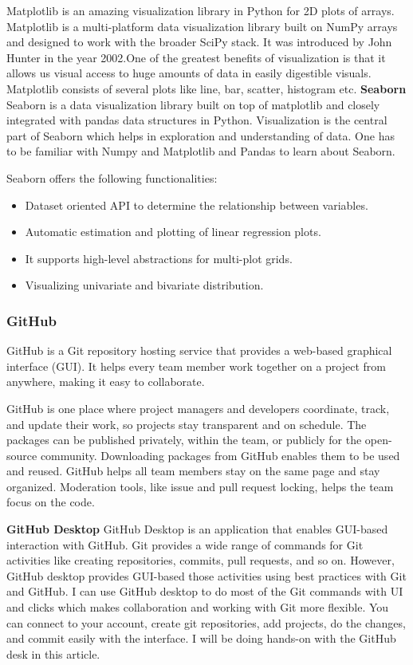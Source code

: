 \documentclass[12pt]{article}
\begin{document}
Matplotlib is an amazing visualization library in Python for 2D plots of arrays. Matplotlib is a multi-platform data visualization library built on NumPy arrays and designed to work with the broader SciPy stack. It was introduced by John Hunter in the year 2002.One of the greatest benefits of visualization is that it allows us visual access to huge amounts of data in easily digestible visuals. Matplotlib consists of several plots like line, bar, scatter, histogram etc.
\textbf{Seaborn}
\\
Seaborn is a data visualization library built on top of matplotlib and closely integrated with pandas data structures in Python. Visualization is the central part of Seaborn which helps in exploration and understanding of data. One has to be familiar with Numpy and Matplotlib and Pandas to learn about Seaborn.

Seaborn offers the following functionalities:
\begin{itemize}
\item Dataset oriented API to determine the relationship between variables.
\item Automatic estimation and plotting of linear regression plots.
\item It supports high-level abstractions for multi-plot grids.
\item Visualizing univariate and bivariate distribution.
\end{itemize}

\newpage
\subsubsection{GitHub}
GitHub is a Git repository hosting service that provides a web-based graphical interface (GUI). It helps every team member work together on a project from anywhere, making it easy to collaborate. 

GitHub is one place where project managers and developers coordinate, track, and update their work, so projects stay transparent and on schedule. The packages can be published privately, within the team, or publicly for the open-source community. Downloading packages from GitHub enables them to be used and reused. GitHub helps all team members stay on the same page and stay organized. Moderation tools, like issue and pull request locking, helps the team focus on the code.

\textbf{GitHub Desktop}
GitHub Desktop is an application that enables GUI-based interaction with GitHub. Git provides a wide range of commands for Git activities like creating repositories, commits, pull requests, and so on. However, GitHub desktop provides GUI-based those activities using best practices with Git and GitHub. I can use GitHub desktop to do most of the Git commands with UI and clicks which makes collaboration and working with Git more flexible. You can connect to your account, create git repositories, add projects, do the changes, and commit easily with the interface. I will be doing hands-on with the GitHub desk in this article.
\end{document}
